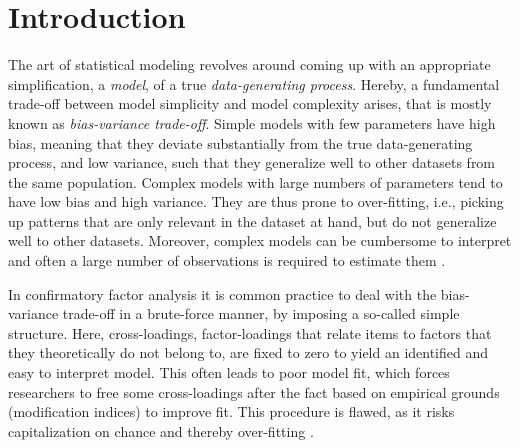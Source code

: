 \documentclass[]{interact}
\theoremstyle{plain}%
\theoremstyle{definition}
\theoremstyle{remark}
\begin{document}
\hypertarget{introduction}{%
\section{Introduction}\label{introduction}}

The art of statistical modeling revolves around coming up with an
appropriate simplification, a \emph{model}, of a true
\emph{data-generating process}. Hereby, a fundamental trade-off between
model simplicity and model complexity arises, that is mostly known as
\emph{bias-variance trade-off}. Simple models with few parameters have
high bias, meaning that they deviate substantially from the true
data-generating process, and low variance, such that they generalize
well to other datasets from the same population. Complex models with
large numbers of parameters tend to have low bias and high variance.
They are thus prone to over-fitting, i.e., picking up patterns that are
only relevant in the dataset at hand, but do not generalize well to
other datasets. Moreover, complex models can be cumbersome to interpret
and often a large number of observations is required to estimate them
\citep{cox_principles_2006, james_introduction_2021}.

In confirmatory factor analysis \citep[CFA,][]{bollen_structural_1989}
it is common practice to deal with the bias-variance trade-off in a
brute-force manner, by imposing a so-called simple structure. Here,
cross-loadings, factor-loadings that relate items to factors that they
theoretically do not belong to, are fixed to zero to yield an identified
and easy to interpret model. This often leads to poor model fit, which
forces researchers to free some cross-loadings after the fact based on
empirical grounds (modification indices) to improve fit. This procedure
is flawed, as it risks capitalization on chance and thereby over-fitting
\citep{maccallum_model_1992}.
\end{document}
